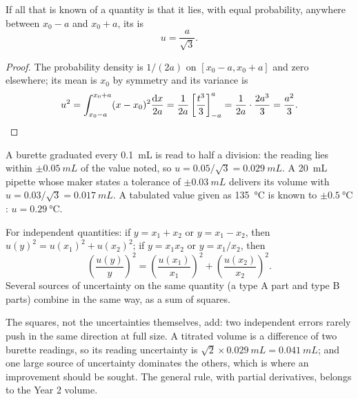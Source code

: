 \begin{proposition}\label{prop:b1:lab-techniques-1:type-b}
If all that is known of a quantity is that it lies, with equal
probability, anywhere between $x_0 - a$ and $x_0 + a$, its  is
\[
  u = \frac{a}{\sqrt3}.
\]
\end{proposition}
\begin{proof}
The probability density is $1/(2a)$ on $[x_0 - a, x_0 + a]$ and zero
elsewhere; its mean is $x_0$ by symmetry and its variance is
\[
  u^2 = \int_{x_0-a}^{x_0+a} (x - x_0)^2 \frac{\mathrm{d}x}{2a}
      = \frac{1}{2a} \left[\frac{t^3}{3}\right]_{-a}^{a}
      = \frac{1}{2a}\cdot\frac{2a^3}{3} = \frac{a^2}{3}. \qedhere
\]
\end{proof}

\begin{example}
A burette graduated every \qty{0.1}{mL} is read to half a division: the
reading lies within $\pm\qty{0.05}{mL}$ of the value noted, so
$u = 0.05/\sqrt3 = \qty{0.029}{mL}$. A \qty{20}{mL} pipette whose maker
states a tolerance of $\pm\qty{0.03}{mL}$ delivers its volume with
$u = 0.03/\sqrt3 = \qty{0.017}{mL}$. A tabulated value given as
\qty{135}{\celsius} is known to $\pm\qty{0.5}{\celsius}$: $u = \qty{0.29}{\celsius}$.
\end{example}

\begin{proposition}\label{prop:b1:lab-techniques-1:combine}
For independent quantities: if $y = x_1 + x_2$ or $y = x_1 - x_2$, then
$u(y)^2 = u(x_1)^2 + u(x_2)^2$; if $y = x_1 x_2$ or $y = x_1/x_2$, then
\[
  \left(\frac{u(y)}{y}\right)^2 = \left(\frac{u(x_1)}{x_1}\right)^2
  + \left(\frac{u(x_2)}{x_2}\right)^2 .
\]
Several sources of uncertainty on the same quantity (a type A part and
type B parts) combine in the same way, as a sum of squares.
\end{proposition}
\admitted

The squares, not the uncertainties themselves, add: two independent
errors rarely push in the same direction at full size. A titrated volume
is a difference of two burette readings, so its reading uncertainty is
$\sqrt2 \times \qty{0.029}{mL} = \qty{0.041}{mL}$; and one large source of
uncertainty dominates the others, which is where an improvement should
be sought. The general rule, with partial derivatives, belongs to the
Year 2 volume.

